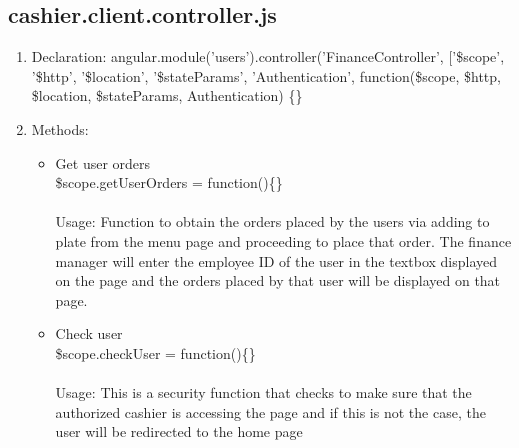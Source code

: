 \documentclass[a4paper,12pt]{article}
\begin{document}
\subsection{cashier.client.controller.js}
\begin{enumerate}
\item Declaration: angular.module('users').controller('FinanceController', ['\$scope', '\$http', '\$location', '\$stateParams', 'Authentication',
    function(\$scope, \$http, \$location, \$stateParams, Authentication) \{\}
\item Methods:
	\begin{itemize}
		\item  Get user orders \\  \$scope.getUserOrders = function()\{\}
		\\ \\ Usage: Function to obtain the orders placed by the users via adding to plate from the menu page and proceeding to place that order. The finance manager will enter the employee ID of the user in the textbox displayed on the page and the orders placed by that user will be displayed on that page.
		\item Check user \\ \$scope.checkUser = function()\{\}
	\\ \\ Usage: This is a security function that checks to make sure that the authorized cashier is accessing the page and if this is not the case, the user will be redirected to the home page
	\end{itemize}	
\end{enumerate}
\end{document}
